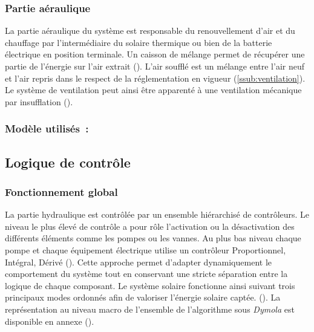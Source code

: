 \subsubsection{Partie aéraulique} %
\label{ssub:partie_aeraulique}
La partie aéraulique du système est responsable du renouvellement d’air et du chauffage
par l’intermédiaire du solaire thermique ou bien de la batterie électrique en
position terminale. Un caisson de mélange permet de récupérer une partie de l’énergie
sur l’air extrait (). L’air soufflé est un mélange entre
l’air neuf et l’air repris dans le respect de la réglementation en vigueur (\ref{ssub:ventilation}).
Le système de ventilation peut ainsi être apparenté à une ventilation mécanique par insufflation
().


\subsubsection{Modèle utilisés~:} %
\label{ssub:modele_utilises}



\subsection{Logique de contrôle} %
\label{sub:logique_de_controle}
\subsubsection{Fonctionnement global} %
\label{ssub:fonctionnement_global}
La partie hydraulique est contrôlée par un ensemble hiérarchisé de contrôleurs. Le niveau
le plus élevé de contrôle a pour rôle l’activation ou la désactivation des différents
éléments comme les pompes ou les vannes. Au plus bas niveau chaque pompe et chaque
équipement électrique utilise un contrôleur Proportionnel, Intégral, Dérivé (). Cette
approche permet d’adapter dynamiquement le comportement du système tout en conservant une
stricte séparation entre la logique de chaque composant. Le système solaire fonctionne
ainsi suivant trois principaux modes ordonnés afin de valoriser l’énergie solaire captée.
(). La représentation au niveau macro de l’ensemble de l’algorithme sous
\textit{Dymola} est disponible en annexe ().

